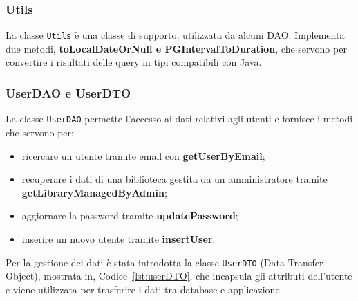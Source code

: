     \subsubsection{Utils}
    La classe \texttt{Utils} è una classe di supporto, utilizzata da alcuni DAO. Implementa due metodi, \textbf{toLocalDateOrNull e PGIntervalToDuration}, che servono per convertire i risultati delle query in tipi compatibili con Java.

    \subsubsection{UserDAO e UserDTO}
    La classe \texttt{UserDAO} permette l'accesso ai dati relativi agli utenti e fornisce i metodi che servono per:
    \begin{itemize}
        \item ricercare un utente tranute email con \textbf{getUserByEmail};
        \item recuperare i dati di una biblioteca gestita da un amministratore tramite \textbf{getLibraryManagedByAdmin};
        \item aggiornare la password tramite \textbf{updatePassword};
        \item inserire un nuovo utente tramite \textbf{insertUser}.
    \end{itemize}
    Per la gestione dei dati è stata introdotta la classe \texttt{UserDTO} (Data Transfer Object), mostrata in, Codice~\ref{lst:userDTO}, che incapsula gli attributi dell'utente e viene utilizzata per trasferire i dati tra database e applicazione.
